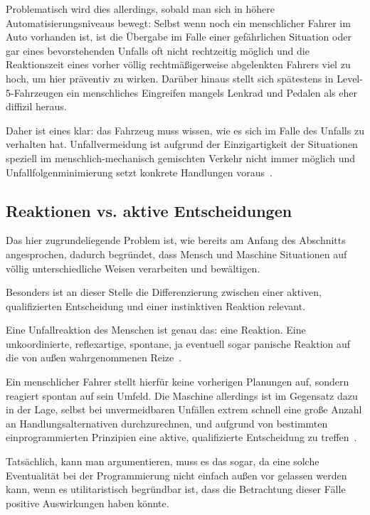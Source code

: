 \documentclass[twocolumn, german]{tum-article}
\begin{document}
Problematisch wird dies allerdings, sobald man sich in höhere Automatisierungsniveaus bewegt:
Selbst wenn noch ein menschlicher Fahrer im Auto vorhanden ist, ist die Übergabe im Falle einer gefährlichen Situation oder gar eines bevorstehenden Unfalls oft nicht rechtzeitig möglich und die Reaktionszeit eines vorher völlig rechtmäßigerweise abgelenkten Fahrers viel zu hoch, um hier präventiv zu wirken.
Darüber hinaus stellt sich spätestens in Level-5-Fahrzeugen ein menschliches Eingreifen mangels Lenkrad und Pedalen als eher diffizil heraus.

Daher ist eines klar: das Fahrzeug muss wissen, wie es sich im Falle des Unfalls zu verhalten hat.
Unfallvermeidung ist aufgrund der Einzigartigkeit der Situationen speziell im menschlich-mechanisch gemischten Verkehr nicht immer möglich und Unfallfolgenminimierung setzt konkrete Handlungen voraus~\cite[S. 71]{maurer-autonomous}.


\subsection{Reaktionen vs. aktive Entscheidungen}
Das hier zugrundeliegende Problem ist, wie bereits am Anfang des Abschnitts angesprochen, dadurch begründet, dass Mensch und Maschine Situationen auf völlig unterschiedliche Weisen verarbeiten und bewältigen.

Besonders ist an dieser Stelle die Differenzierung zwischen einer aktiven, qualifizierten Entscheidung und einer instinktiven Reaktion relevant.

Eine Unfallreaktion des Menschen ist genau das: eine Reaktion.
Eine unkoordinierte, reflexartige, spontane, ja eventuell sogar panische Reaktion auf die von außen wahrgenommenen Reize~\cite{maurer-autonomous}.

Ein menschlicher Fahrer stellt hierfür keine vorherigen Planungen auf, sondern reagiert spontan auf sein Umfeld.
Die Maschine allerdings ist im Gegensatz dazu in der Lage, selbst bei unvermeidbaren Unfällen extrem schnell eine große Anzahl an Handlungsalternativen durchzurechnen, und aufgrund von bestimmten einprogrammierten Prinzipien eine aktive, qualifizierte Entscheidung zu treffen~\cite[S. 1278]{nyholm-ethics}.

Tatsächlich, kann man argumentieren, muss es das sogar, da eine solche Eventualität bei der Programmierung nicht einfach außen vor gelassen werden kann, wenn es utilitaristisch begründbar ist, dass die Betrachtung dieser Fälle positive Auswirkungen haben könnte.
\end{document}
